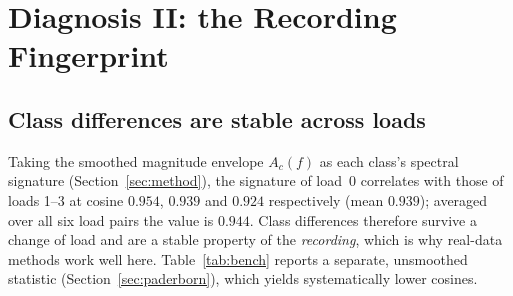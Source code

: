 \documentclass[journal]{IEEEtran}
\begin{document}
\begin{table}[t]
\centering
\caption{Training only on a synthetic source, testing on the real target load
(load~3, ten classes). Each entry is $20$ runs --- ten seeds, the whole
configuration repeated twice --- and the $\pm$ is the standard deviation over
those $20$ runs. ``Disc.''\ is a domain discriminator
trained on backbone features to separate the synthetic source from real target
data ($0.5$ = indistinguishable). Every synthetic set is drawn with a
randomized resonance frequency ($2850$--$3550$\,Hz), impulse power and harmonic
amplitudes and phases, and with jittered impulse timing, so each row averages
over generator parameters as well as seeds. The two
repetitions of the target-fingerprint row differ by $0.033$ in the mean of ten
seeds, and a single ten-seed draw would understate that row's spread by a
factor of two.}
\label{tab:synth}
\small
{}
\end{table}

\section{Diagnosis II: the Recording Fingerprint}
\label{sec:diag2}

\subsection{Class differences are stable across loads}
Taking the smoothed magnitude envelope $A_c(f)$ as each class's spectral
signature (Section~\ref{sec:method}), the signature of load~0 correlates with
those of loads 1--3 at cosine $0.954$, $0.939$ and $0.924$ respectively (mean
$0.939$); averaged over all six load pairs the value is $0.944$. Class
differences therefore survive a change of load and are a stable property of the
\emph{recording}, which is why real-data methods work well here.
Table~\ref{tab:bench} reports a separate, unsmoothed statistic
(Section~\ref{sec:paderborn}), which yields systematically lower cosines.
\end{document}
